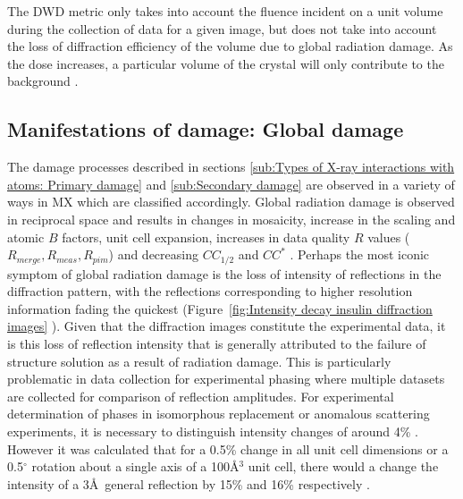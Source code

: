         The DWD metric only takes into account the fluence incident on a unit volume during the collection of data for a given image, but does not take into account the loss of diffraction efficiency of the volume due to global radiation damage.
        As the dose increases, a particular volume of the crystal will only contribute to the background \cite{blake1962}.

    \subsection{Manifestations of damage: Global damage}
    \label{sub:Manifestations of damage: Global damage}
        The damage processes described in sections \ref{sub:Types of X-ray interactions with atoms: Primary damage} and \ref{sub:Secondary damage} are observed in a variety of ways in MX which are classified accordingly.
        Global radiation damage is observed in reciprocal space and results in changes in mosaicity, increase in the scaling and atomic $B$ factors, unit cell expansion, increases in data quality $R$ values ($R_{merge}, R_{meas}, R_{pim}$) and decreasing $CC_{1/2}$ and $CC^*$ \cite{garman2010}.
        Perhaps the most iconic symptom of global radiation damage is the loss of intensity of reflections in the diffraction pattern, with the reflections corresponding to higher resolution information fading the quickest (Figure~\ref{fig:Intensity decay insulin diffraction images} ).
        Given that the diffraction images constitute the experimental data, it is this loss of reflection intensity that is generally attributed to the failure of structure solution as a result of radiation damage.
        This is particularly problematic in data collection for experimental phasing where multiple datasets are collected for comparison of reflection amplitudes.
        For experimental determination of phases in isomorphous replacement or anomalous scattering experiments, it is necessary to distinguish intensity changes of around 4\% \cite{taylor2010}.
        However it was calculated that for a 0.5\% change in all unit cell dimensions or a 0.5$^{\circ}$ rotation about a single axis of a 100\AA$^3$ unit cell, there would a change the intensity of a 3\AA\ general reflection by 15\% and 16\% respectively \cite{crick1956}.
